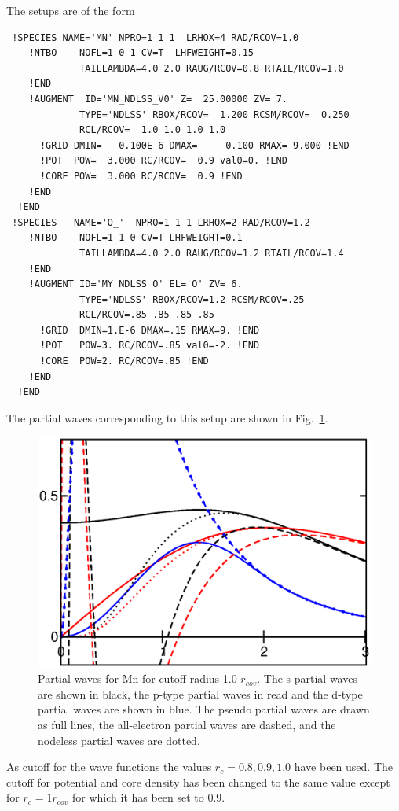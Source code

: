 \documentclass[11pt,a4paper]{report}
\begin{document}
The setups are of the form
\begin{verbatim}
 !SPECIES NAME='MN' NPRO=1 1 1  LRHOX=4 RAD/RCOV=1.0
    !NTBO    NOFL=1 0 1 CV=T  LHFWEIGHT=0.15
             TAILLAMBDA=4.0 2.0 RAUG/RCOV=0.8 RTAIL/RCOV=1.0
    !END
    !AUGMENT  ID='MN_NDLSS_V0' Z=  25.00000 ZV= 7.
             TYPE='NDLSS' RBOX/RCOV=  1.200 RCSM/RCOV=  0.250
             RCL/RCOV=  1.0 1.0 1.0 1.0
      !GRID DMIN=   0.100E-6 DMAX=     0.100 RMAX= 9.000 !END
      !POT  POW=  3.000 RC/RCOV=  0.9 val0=0. !END
      !CORE POW=  3.000 RC/RCOV=  0.9 !END
    !END
  !END
 !SPECIES   NAME='O_'  NPRO=1 1 1 LRHOX=2 RAD/RCOV=1.2
    !NTBO    NOFL=1 1 0 CV=T LHFWEIGHT=0.1
             TAILLAMBDA=4.0 2.0 RAUG/RCOV=1.2 RTAIL/RCOV=1.4
    !END
    !AUGMENT ID='MY_NDLSS_O' EL='O' ZV= 6.
             TYPE='NDLSS' RBOX/RCOV=1.2 RCSM/RCOV=.25
             RCL/RCOV=.85 .85 .85 .85
      !GRID  DMIN=1.E-6 DMAX=.15 RMAX=9. !END
      !POT   POW=3. RC/RCOV=.85 val0=-2. !END
      !CORE  POW=2. RC/RCOV=.85 !END
    !END
  !END
\end{verbatim}
The partial waves corresponding to this setup are shown in
Fig.~\ref{fig:mnpartialwaves}.
\begin{figure}[!h]
\begin{center}
\includegraphics[width=0.8\linewidth]{Figs/Mn_setuptest/mnpartialwaves.eps}
\end{center}
\caption{\label{fig:mnpartialwaves} Partial waves for Mn for cutoff
  radius 1.0-$r_{cov}$.  The s-partial waves are shown in black, the
  p-type partial waves in read and the d-type partial waves are shown
  in blue. The pseudo partial waves are drawn as full lines, the
  all-electron partial waves are dashed, and the nodeless partial
  waves are dotted.}
\end{figure}

As cutoff for the wave functions the values $r_c=0.8,0.9,1.0$ have
been used. The cutoff for potential and core density has been changed
to the same value except for $r_c=1r_{cov}$ for which it has been set
to 0.9.
\end{document}

